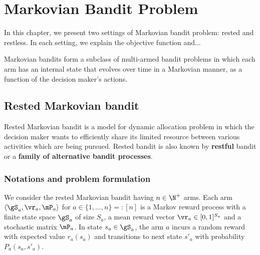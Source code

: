 \begingroup
\let\clearpage\relax

\chapter{Markovian Bandit Problem}
\label{ch:mb}

In this chapter, we present two settings of Markovian bandit problem: rested and restless.
In each setting, we explain the objective function and...

Markovian bandits form a subclass of multi-armed bandit problems in which each arm has an internal state that evolves over time in a Markovian manner, as a function of the decision maker’s actions.

\section{Rested Markovian bandit}
\label{sec:rested_mab}

Rested Markovian bandit is a model for dynamic allocation problem in which the decision maker wants to efficiently share its limited resource between various activities which are being pursued.
Rested bandit is also known by \textbf{restful} bandit or a \textbf{family of alternative bandit processes}.


\subsection{Notations and problem formulation}
\label{ssec:rested_formul}

We consider the rested Markovian bandit having $n\in\N^+$ arms.
Each arm $\langle\gS_a, \vr_a, \mP_a\rangle$ for $a\in\{1,\dots,n\}=:[n]$ is a Markov reward process with a finite state space $\gS_a$ of size $S_a$, a mean reward vector $\vr_a\in[0,1]^{S_a}$ and a stochastic matrix $\mP_a$.
In state $s_a\in\gS_a$, the arm $a$ incurs a random reward with expected value $r_a(s_a)$ and transitions to next state $s'_a$ with probability $P_a(s_a,s'_a)$.

